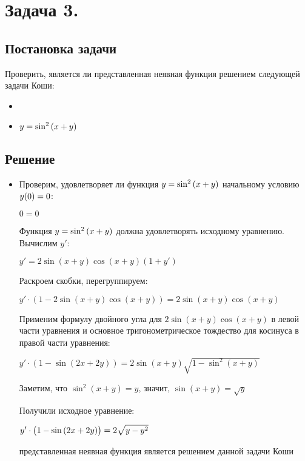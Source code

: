 

\section{Задача 3.}
\subsection{Постановка задачи}
Проверить, является ли представленная неявная функция решением следующей задачи Коши:
\begin{itemize}[label={}]
	\item
		\customCases
			{\equation}
			{\condition}
	\item
		$ y = \sin^{2}{(x + y)} $
\end{itemize}

\subsection{Решение}

\begin{itemize}[label={}]
	\item
		Проверим, удовлетворяет ли функция $ y = \sin^{2}{(x + y)} $ начальному условию $ y(0) = 0 $:
		
		\subitem 
			$ 0 = 0 $
		
		Функция $ y = \sin^{2}{(x + y)} $ должна удовлетворять исходному уравнению.
		Вычислим $ y' $:
		
		\subitem 
			$ {y}' = 2\sin{(x + y)}\cos{(x + y)}(1 + {y}') $
			
		Раскроем скобки, перегруппируем:	
			
		\subitem	
			$ {y}' \cdot (1 - 2\sin{(x + y)}\cos{(x + y)}) = 2\sin{(x + y)}\cos{(x + y)} $
			
		Применим формулу двойного угла для $ 2\sin{(x + y)}\cos{(x + y)} $ 
		в левой части уравнения и основное тригонометрическое тождество для косинуса 
		в правой части уравнения:
		
		\subitem 
			$ {y}' \cdot (1 - \sin{(2x + 2y)}) = 2\sin{(x + y)}\sqrt{1 - \sin^2{(x + y)}} $
			
		Заметим, что $ \sin^2(x + y) = {y} $, значит, $ \sin{(x+y)} = \sqrt{y} $
		
		Получили исходное уравнение:
		
		\subitem
			$ {y}' \cdot \big(1 - \sin{(2x + 2y)} \big) = 2\sqrt{y - y^{2}} $
			
		\answer представленная неявная функция является решением данной задачи Коши
\end{itemize}
